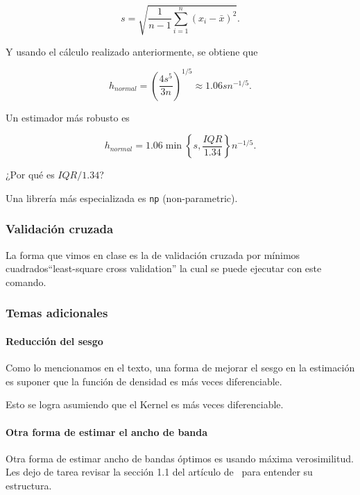 \documentclass[12pt]{book}\usepackage[]{graphicx}\usepackage[]{color}
\theoremstyle{definition}
\theoremstyle{plain}
\begin{document}
 \[
 s = \sqrt{\frac{1}{n-1} \sum_{i=1}^n (x_i - \bar{x})^2  }.
 \]

 Y usando el cálculo realizado anteriormente, se obtiene que

 \[
 h_{normal} = \left( \frac{4 s^5}{3n} \right)^{1/5} \approx 1.06 s n^{-1/5}.
 \]

 Un estimador más robusto es

 \[
 h_{normal} =  1.06 \min \left\{ s , \frac{IQR}{1.34} \right\} n^{-1/5}.
 \]

 ¿Por qué es $IQR / 1.34$?







 Una librería más especializada es \texttt{np} (non-parametric).



 \subsubsection{Validación cruzada}

 La forma que vimos en clase es la de validación cruzada por mínimos
 cuadrados``least-square cross validation'' la cual se puede ejecutar
 con este comando.





 \subsubsection{Temas adicionales}

 \paragraph{Reducción del sesgo}
 Como lo mencionamos en el texto, una forma de mejorar el sesgo en la estimación es suponer que la función de densidad es más veces diferenciable.

 Esto se logra asumiendo que el Kernel es más veces diferenciable.





 \paragraph{Otra forma de estimar el ancho de banda} Otra forma de estimar ancho de bandas óptimos es usando máxima verosimilitud. Les dejo de tarea revisar la sección 1.1 del artículo de~\textcite{Hall1987} para entender su estructura.
\end{document}
